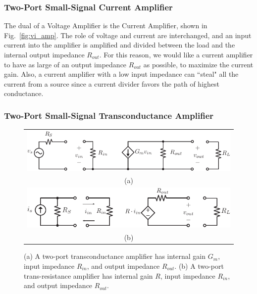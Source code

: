 \subsubsection{Two-Port Small-Signal Current Amplifier}
The dual of a Voltage Amplifier is the Current Amplifier, shown in Fig.~\ref{fig:vi_amp}.  The role of voltage and current are interchanged, and an input current into the amplifier is amplified and divided between the load and the internal output impedance $R_{out}$.  For this reason, we would like a current amplifier to have as large of an output impedance $R_{out}$ as possible, to maximize the current gain.  Also, a current amplifier with a low input impedance can ``steal" all the current from a source since a current divider favors the path of highest conductance.
\subsubsection{Two-Port Small-Signal Transconductance Amplifier}
\begin{figure}[tb]
\begin{center}
\begin{tabular}{c}
\includegraphics[width=.7\columnwidth]{gmamp} \\
(a) \\
\includegraphics[width=.7\columnwidth]{ramp} \\
(b) \\
\end{tabular}
\end{center}
\caption{(a) A two-port transconductance amplifier has internal gain $G_m$, input impedance $R_{in}$, and output impedance $R_{out}$.  (b) A two-port trans-resistance amplifier has internal gain $R$, input impedance $R_{in}$, and output impedance $R_{out}$.}
\label{fig:gm_z_amp}
\end{figure}

